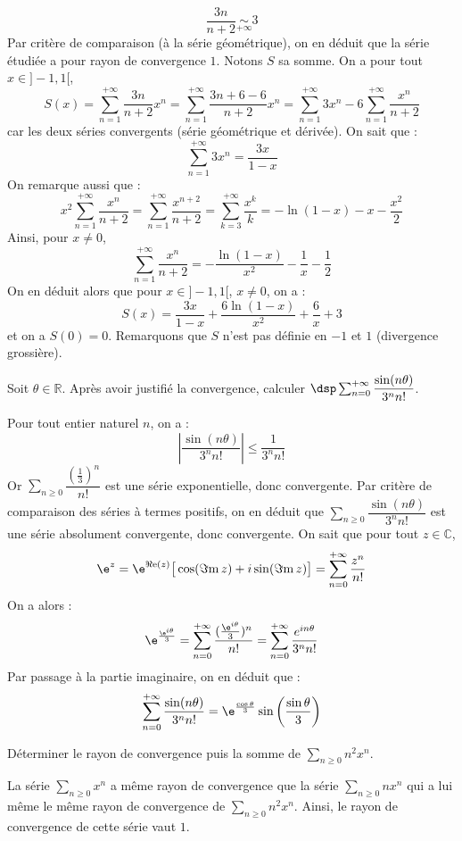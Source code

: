 \documentclass[a4paper,10pt]{report}
\newcommand{\Sum}[2]{\ensuremath{\textstyle{\sum\limits_{#1}^{#2}}}}
\begin{document}
$$  \dfrac{3n}{n+2} \underset{+ \infty}{\sim} 3$$
Par critère de comparaison (à la série géométrique), on en déduit que la série étudiée a pour rayon de convergence $1$. Notons $S$ sa somme. On a pour tout $x \in ]-1,1[$,
$$ S(x) = \sum_{n=1}^{+ \infty}  \dfrac{3n}{n+2} x^n = \sum_{n=1}^{+ \infty}  \dfrac{3n+6-6}{n+2} x^n = \sum_{n=1}^{+ \infty} 3x^n - 6 \sum_{n=1}^{+ \infty} \dfrac{x^n}{n+2}$$
car les deux séries convergents (série géométrique et dérivée). On sait que :
$$ \sum_{n=1}^{+ \infty} 3x^n = \dfrac{3x}{1-x}$$
On remarque aussi que :
$$ x^2 \sum_{n=1}^{+ \infty} \dfrac{x^n}{n+2} = \sum_{n=1}^{+ \infty} \dfrac{x^{n+2}}{n+2} = \sum_{k=3}^{+\infty} \dfrac{x^k}{k} = - \ln(1-x) -x - \dfrac{x^2}{2}   $$
Ainsi, pour $x \neq 0$,
$$ \sum_{n=1}^{+ \infty} \dfrac{x^n}{n+2} = - \dfrac{\ln(1-x)}{x^2} - \dfrac{1}{x} - \dfrac{1}{2}$$
On en déduit alors que pour $x \in ]-1,1[$, $x \neq 0$, on a :
$$ S(x) =  \dfrac{3x}{1-x}  + \dfrac{6\ln(1-x)}{x^2} + \dfrac{6}{x} +3$$
et on a $S(0)= 0$. Remarquons que $S$ n'est pas définie en $-1$ et $1$ (divergence grossière).

\begin{Exa} Soit $\theta\in\mathbb{R}$. Après avoir justifié la convergence, calculer $\dsp\sum_{n=0}^{+\infty}\dfrac{\sin(n\theta)}{3^nn!}$.
\end{Exa}

\corr Pour tout entier naturel $n$, on a : 
\[
\left\vert\dfrac{\sin(n\theta)}{3^n n!}\right\vert\leq \dfrac{1}{3^n n!}
\]
Or $\Sum{n \geq 0}{} \dfrac{(\frac{1}{3})^n}{ n!}$ est une série exponentielle, donc convergente. Par critère de comparaison des séries à termes positifs, on en déduit que $\Sum{n \geq 0}{} \dfrac{\sin(n\theta)}{3^n n!}$ est une série absolument convergente, donc convergente. On sait que pour tout $z \in \mathbb{C}$,
$$\e^{z}=\e^{\Re\mathrm{e}(z)}\big[\cos(\Im\mathrm{m}\,z)+i\sin(\Im\mathrm{m}\,z) \big]= \sum_{n =0}^{+ \infty} \dfrac{z^n}{n!}$$
On a alors : 
$$ \e^{\frac{\e^{i\theta}}{3}}= \sum_{n=0}^{+\infty}\dfrac{(\frac{\e^{i\theta}}{3})^n}{n!} = \sum_{n=0}^{+ \infty} \dfrac{e^{i n \theta}}{3^n n!}$$
Par passage à la partie imaginaire, on en déduit que :
$$ \sum_{n=0}^{+\infty}\dfrac{\sin(n\theta)}{3^nn!} = \e^{\frac{\cos\theta}{3}}\sin\left(\dfrac{\sin\theta}{3}\right)$$

\begin{Exa} Déterminer le rayon de convergence puis la somme de $\Sum{n \geq 0}{} n^2x^n$.
\end{Exa}

\corr La série $\Sum{n \geq 0}{} x^n$ a même rayon de convergence que  la série $\Sum{n \geq 0}{} nx^n$ qui a lui même le même rayon de convergence de $\Sum{n \geq 0}{} n^2x^n$. Ainsi, le rayon de convergence de cette série vaut $1$.
\end{document}
